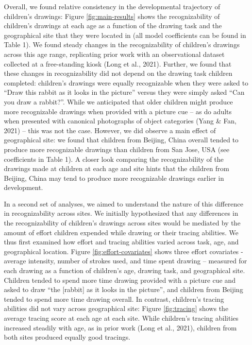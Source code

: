 \documentclass[
  english,
  man]{apa6}
\begin{document}
Overall, we found relative consistency in the developmental trajectory of children's drawings: Figure \ref{fig:main-results} shows the recognizability of children's drawings at each age as a function of the drawing task and the geographical site that they were located in (all model coefficients can be found in Table 1). We found steady changes in the recognizability of children's drawings across this age range, replicating prior work with an observational dataset collected at a free-standing kiosk (Long et al., 2021). Further, we found that these changes in recognizability did not depend on the drawing task children completed: children's drawings were equally recognizable when they were asked to \enquote{Draw this rabbit as it looks in the picture} versus they were simply asked \enquote{Can you draw a rabbit?}. While we anticipated that older children might produce more recognizable drawings when provided with a picture cue -- as do adults when presented with canonical photographs of object categories (Yang \& Fan, 2021) -- this was not the case. However, we did observe a main effect of geographical site: we found that children from Beijing, China overall tended to produce more recognizable drawings than children from San Jose, USA (see coefficients in Table 1). A closer look comparing the recognizability of the drawings made at children at each age and site hints that the children from Beijing, China may tend to produce more recognizable drawings earlier in development.

In a second set of analyses, we aimed to understand the nature of this difference in recognizability across sites. We initially hypothesized that any differences in the recognizability of children's drawings across sites would be mediated by the amount of effort children expended while drawing or their tracing abilities. We thus first examined how effort and tracing abilities varied across task, age, and geographical location. Figure \ref{fig:effort-covariates} shows three effort covariates - average intensity, number of strokes used, and time spent drawing -- measured for each drawing as a function of children's age, drawing task, and geographical site. Children tended to spend more time drawing provided with a picture cue and asked to draw \enquote{the {[}rabbit{]} as it looks in the picture}, and children from Beijing tended to spend more time drawing overall. In contrast, children's tracing abilities did not vary across geographical site: Figure \ref{fig:tracing} shows the average tracing score at each age at each site. While children's tracing abilities increased steadily with age, as in prior work (Long et al., 2021), children from both sites produced equally good tracings.
\end{document}
